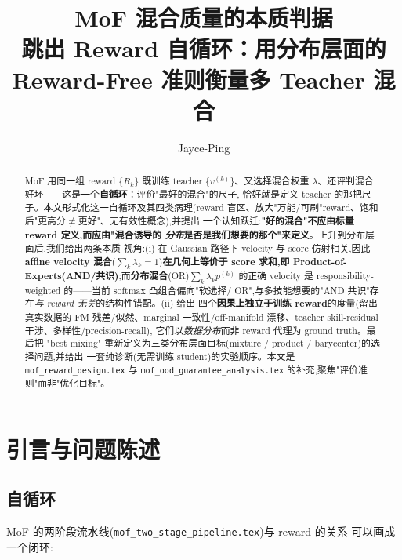 \documentclass[11pt,a4paper]{article}
\title{\textbf{MoF 混合质量的本质判据}\\[0.3em]
\large 跳出 Reward 自循环：用分布层面的 Reward-Free 准则衡量多 Teacher 混合}
\author{Jayce-Ping}
\date{}
\theoremstyle{definition}
\begin{document}
\maketitle

\begin{abstract}
MoF 用同一组 reward $\{R_k\}$ 既训练 teacher $\{v^{(k)}\}$、又选择混合权重
$\lambda$、还评判混合好坏——这是一个\textbf{自循环}：评价"最好的混合"的尺子,
恰好就是定义 teacher 的那把尺子。本文形式化这一自循环及其四类病理(reward
盲区、放大"万能/可刷"reward、饱和后"更高分$\neq$更好"、无有效性概念),并提出
一个认知跃迁:\textbf{"好的混合"不应由标量 reward 定义,而应由"混合诱导的
\emph{分布}是否是我们想要的那个"来定义}。上升到分布层面后,我们给出两条本质
视角:(i) 在 Gaussian 路径下 velocity 与 score 仿射相关,因此 \textbf{affine
velocity 混合}($\sum_k\lambda_k=1$)\textbf{在几何上等价于 score 求和,即
Product-of-Experts(AND/共识)};而\textbf{分布混合}(OR)$\sum_k\lambda_k p^{(k)}$
的正确 velocity 是 responsibility-weighted 的——当前 softmax 凸组合偏向"软选择/
OR",与多技能想要的"AND 共识"存在\emph{与 reward 无关}的结构性错配。(ii) 给出
四个\textbf{因果上独立于训练 reward}的度量(留出真实数据的 FM 残差/似然、marginal
一致性/off-manifold 漂移、teacher skill-residual 干涉、多样性/precision-recall),
它们以\emph{数据分布}而非 reward 代理为 ground truth。最后把 "best mixing"
重新定义为三类分布层面目标(mixture / product / barycenter)的选择问题,并给出
一套纯诊断(无需训练 student)的实验顺序。本文是
\texttt{mof\_reward\_design.tex} 与 \texttt{mof\_ood\_guarantee\_analysis.tex}
的补充,聚焦"评价准则"而非"优化目标"。
\end{abstract}

\tableofcontents
\newpage

\section{引言与问题陈述}
\label{sec:intro}

\subsection{自循环}
\label{ssec:selfloop}

MoF 的两阶段流水线(\texttt{mof\_two\_stage\_pipeline.tex})与 reward 的关系
可以画成一个闭环:
\end{document}
